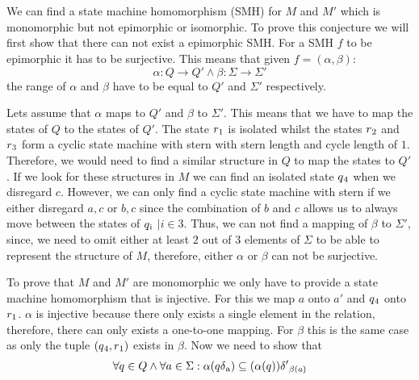 \documentclass[a4paper,12pt,numbers=noenddot]{scrreport}
\begin{document}

\setcounter{chapter}{3}
\chapter{}
\section{}

We can find a state machine homomorphism (SMH) for $M$ and $M'$ which is monomorphic but not epimorphic or isomorphic. To prove this conjecture we will first show that there can not exist a epimorphic SMH. For a SMH $f$ to be epimorphic it has to be surjective.
This means that given $f=(\alpha, \beta)$:
\begin{equation}
    \alpha : Q \rightarrow Q' \land \beta : \Sigma \rightarrow \Sigma'
\end{equation}
the range of $\alpha$ and $\beta$ have to be equal to $Q'$ and $\Sigma'$ respectively.

Lets assume that $\alpha$ maps to $Q'$ and $\beta$ to $\Sigma'$. This means that we have to map the states of $Q$ to the states of $Q'$. The state $r\textsubscript{1}$ is isolated whilst the states $r\textsubscript{2}$ and $r\textsubscript{3}$ form a cyclic state machine with stern with stern length and cycle length of $1$. Therefore, we would need to find a similar structure in $Q$ to map the states to $Q'$. If we look for these structures in $M$ we can find an isolated state $q\textsubscript{4}$ when we disregard $c$. However, we can only find a cyclic state machine with stern if we either disregard $a,c$ or $b,c$ since the combination of $b$ and $c$ allows us to always move between the states of $q\textsubscript{i}$ $| i \in {3}$. Thus, we can not find a mapping of $\beta$ to $\Sigma'$, since, we need to omit either at least $2$ out of $3$ elements of $\Sigma$ to be able to represent the structure of $M$, therefore, either $\alpha$ or $\beta$ can not be surjective.

To prove that $M$ and $M'$ are monomorphic we only have to provide a state machine homomorphism that is injective. For this we map $a$ onto $a'$ and $q\textsubscript{4}$ onto $r\textsubscript{1}$. $\alpha$ is injective because there only exists a single element in the relation, therefore, there can only exists a one-to-one mapping. For $\beta$ this is the same case as only the tuple $(q\textsubscript{4}, r\textsubscript{1})$ exists in $\beta$. 
Now we need to show that
\begin{equation}
\forall q \in Q \land \forall a \in \Sigma : \alpha(q\delta\textsubscript{a}) \subseteq (\alpha(q))\delta'\textsubscript{$\beta(a)$}
\end{equation}
\end{document}
